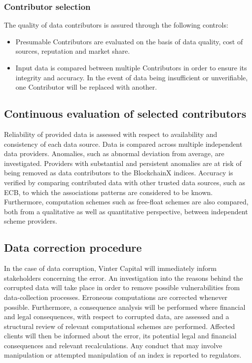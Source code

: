 \documentclass{article}
\begin{document}
\subsubsection{Contributor selection}
The quality of data contributors is assured through the following controls: 
\begin{itemize}
    \item Presumable Contributors are evaluated on the basis of data quality, cost of sources, reputation and market share.
    \item Input data is compared between multiple Contributors in order to ensure its integrity and accuracy. In the event of data being insufficient or unverifiable, one Contributor will be replaced with another. 
\end{itemize}

\subsection{Continuous evaluation of selected contributors}
Reliability of provided data is assessed with respect to availability and consistency of each data source. Data is compared across multiple independent data providers. Anomalies, such as abnormal deviation from average, are investigated. Providers with substantial and persistent anomalies are at risk of being removed as data contributors to the BlockchainX indices. Accuracy is verified by comparing contributed data with other trusted data sources, such as ECB, to which the associations patterns are considered to be known. Furthermore, computation schemes such as free-float schemes are also compared, both from a qualitative as well as quantitative perspective, between independent scheme providers.

\subsection{Data correction procedure}
In the case of data corruption, Vinter Capital will immediately inform stakeholders concerning the error. An investigation into the reasons behind the corrupted data will take place in order to remove possible vulnerabilities from data-collection processes. Erroneous computations are corrected whenever possible. Furthermore, a consequence analysis will be performed where financial and legal consequences, with respect to corrupted data, are assessed and a structural review of relevant computational schemes are performed. Affected clients will then be informed about the error, its potential legal and financial consequences and relevant recalculations. Any conduct that may involve manipulation or attempted manipulation of an index is reported to regulators.
\end{document}
